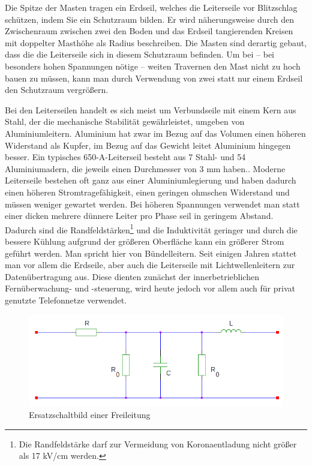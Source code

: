 Die Spitze der Masten tragen ein Erdseil, welches die Leiterseile vor Blitzschlag schützen, indem Sie ein Schutzraum bilden. Er wird näherungsweise durch den Zwischenraum zwischen zwei den Boden und das Erdseil tangierenden Kreisen mit doppelter Masthöhe als Radius beschreiben. Die Masten sind derartig gebaut, dass die die Leiterseile sich in diesem Schutzraum befinden. Um bei – bei besonders hohen Spannungen nötige – weiten Travernen den Mast nicht zu hoch bauen zu müssen, kann man durch Verwendung von zwei statt nur einem Erdseil den Schutzraum vergrößern.

Bei den Leiterseilen handelt es sich meist um Verbundseile mit einem Kern aus Stahl, der die mechanische Stabilität gewährleistet, umgeben von Aluminiumleitern. Aluminium hat zwar im Bezug auf das Volumen einen höheren Widerstand als Kupfer, im Bezug auf das Gewicht leitet Aluminium hingegen besser. Ein typisches 650-A-Leiterseil besteht aus 7 Stahl- und 54 Aluminiumadern, die jeweils einen Durchmesser von 3 mm haben.\cite{Harrison}.
Moderne Leiterseile bestehen oft ganz aus einer Aluminiumlegierung und haben dadurch einen höheren Stromtragefähigkeit, einen geringen ohmschen Widerstand und müssen weniger gewartet werden\cite{Harrison}.
Bei höheren Spannungen verwendet man statt einer dicken mehrere dünnere Leiter pro Phase seil in geringem Abstand. Dadurch sind die Randfeldstärken\footnote{Die Randfeldstärke darf zur Vermeidung von Koronaentladung nicht größer als 17 kV/cm werden.\cite{Flosdorff}} und die Induktivität geringer und durch die bessere Kühlung aufgrund der größeren Oberfläche kann ein größerer Strom geführt werden. Man spricht hier von Bündelleitern.
Seit einigen Jahren stattet man vor allem die Erdseile, aber auch die Leiterseile mit Lichtwellenleitern zur Datenübertragung aus. Diese dienten zunächst der innerbetrieblichen Fernüberwachung- und -steuerung, wird heute jedoch vor allem auch für privat genutzte Telefonnetze verwendet.\cite{Flosdorff}

\begin{figure}[tbhn]
\label{Ersatzschaltbildfreileitung}
\includegraphics[scale=0.5]{freileitung.png}
\caption{Ersatzschaltbild einer Freileitung} %
\end{figure}

